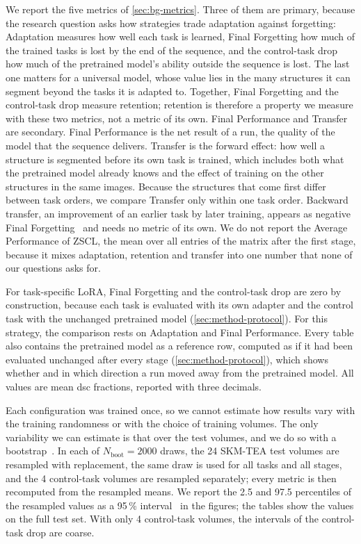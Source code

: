 We report the five metrics of \cref{sec:bg-metrics}.
Three of them are primary, because the research question asks how strategies trade adaptation against forgetting: Adaptation measures how well each task is learned, Final Forgetting how much of the trained tasks is lost by the end of the sequence, and the control-task drop how much of the pretrained model's ability outside the sequence is lost.
The last one matters for a universal model, whose value lies in the many structures it can segment beyond the tasks it is adapted to.
Together, Final Forgetting and the control-task drop measure retention; retention is therefore a property we measure with these two metrics, not a metric of its own.
Final Performance and Transfer are secondary.
Final Performance is the net result of a run, the quality of the model that the sequence delivers.
Transfer is the forward effect: how well a structure is segmented before its own task is trained, which includes both what the pretrained model already knows and the effect of training on the other structures in the same images.
Because the structures that come first differ between task orders, we compare Transfer only within one task order.
Backward transfer, an improvement of an earlier task by later training, appears as negative Final Forgetting~\cite[Sec.~3]{Chaudhry_2018} and needs no metric of its own.
We do not report the Average Performance of ZSCL, the mean over all entries of the matrix after the first stage, because it mixes adaptation, retention and transfer into one number that none of our questions asks for.

For task-specific LoRA, Final Forgetting and the control-task drop are zero by construction, because each task is evaluated with its own adapter and the control task with the unchanged pretrained model (\cref{sec:method-protocol}).
For this strategy, the comparison rests on Adaptation and Final Performance.
Every table also contains the pretrained model as a reference row, computed as if it had been evaluated unchanged after every stage (\cref{sec:method-protocol}), which shows whether and in which direction a run moved away from the pretrained model.
All values are mean \gls{dsc} fractions, reported with three decimals.

Each configuration was trained once, so we cannot estimate how results vary with the training randomness or with the choice of training volumes.
The only variability we can estimate is that over the test volumes, and we do so with a bootstrap~\cite{efron1993bootstrap}.
In each of $N_{\mathrm{boot}} = 2000$ draws, the 24 SKM-TEA test volumes are resampled with replacement, the same draw is used for all tasks and all stages, and the 4 control-task volumes are resampled separately; every metric is then recomputed from the resampled means.
We report the 2.5 and 97.5 percentiles of the resampled values as a 95\,\% interval~\cite{efron1993bootstrap} in the figures; the tables show the values on the full test set.
With only 4 control-task volumes, the intervals of the control-task drop are coarse.

